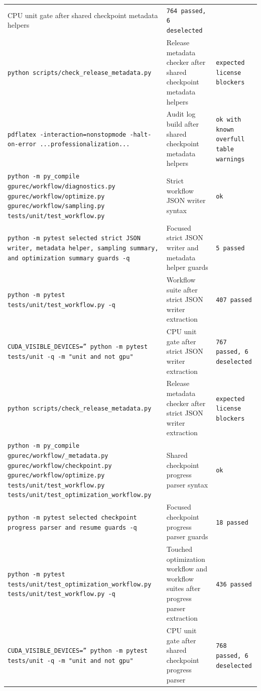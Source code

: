\documentclass[11pt]{article}
\begin{document}
\begin{center}
\begin{tabular}{lll}
CPU unit gate after shared checkpoint metadata helpers &
\texttt{764 passed, 6 deselected} \\
\texttt{python scripts/check\_release\_metadata.py} &
Release metadata checker after shared checkpoint metadata helpers &
\texttt{expected license blockers} \\
\texttt{pdflatex -interaction=nonstopmode -halt-on-error ...professionalization...} &
Audit log build after shared checkpoint metadata helpers &
\texttt{ok with known overfull table warnings} \\
\texttt{python -m py\_compile gpurec/workflow/diagnostics.py gpurec/workflow/optimize.py gpurec/workflow/sampling.py tests/unit/test\_workflow.py} &
Strict workflow JSON writer syntax &
\texttt{ok} \\
\texttt{python -m pytest selected strict JSON writer, metadata helper, sampling summary, and optimization summary guards -q} &
Focused strict JSON writer and metadata helper guards &
\texttt{5 passed} \\
\texttt{python -m pytest tests/unit/test\_workflow.py -q} &
Workflow suite after strict JSON writer extraction &
\texttt{407 passed} \\
\texttt{CUDA\_VISIBLE\_DEVICES='' python -m pytest tests/unit -q -m "unit and not gpu"} &
CPU unit gate after strict JSON writer extraction &
\texttt{767 passed, 6 deselected} \\
\texttt{python scripts/check\_release\_metadata.py} &
Release metadata checker after strict JSON writer extraction &
\texttt{expected license blockers} \\
\texttt{python -m py\_compile gpurec/workflow/\_metadata.py gpurec/workflow/checkpoint.py gpurec/workflow/optimize.py tests/unit/test\_workflow.py tests/unit/test\_optimization\_workflow.py} &
Shared checkpoint progress parser syntax &
\texttt{ok} \\
\texttt{python -m pytest selected checkpoint progress parser and resume guards -q} &
Focused checkpoint progress parser guards &
\texttt{18 passed} \\
\texttt{python -m pytest tests/unit/test\_optimization\_workflow.py tests/unit/test\_workflow.py -q} &
Touched optimization workflow and workflow suites after progress parser extraction &
\texttt{436 passed} \\
\texttt{CUDA\_VISIBLE\_DEVICES='' python -m pytest tests/unit -q -m "unit and not gpu"} &
CPU unit gate after shared checkpoint progress parser &
\texttt{768 passed, 6 deselected} \\

\end{tabular}
\end{center}
\end{document}
